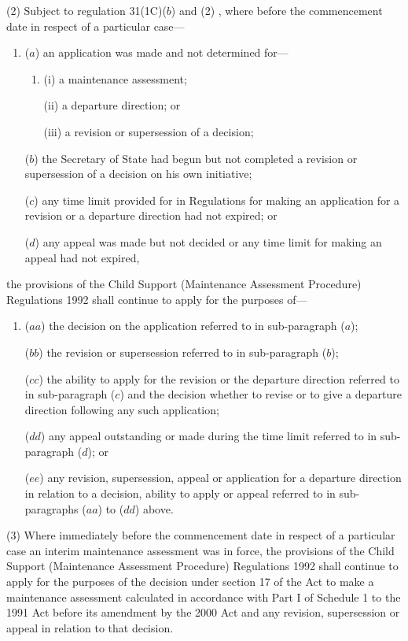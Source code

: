 \documentclass[12pt,a4paper]{article}
\begin{document}
(2) Subject to 
regulation 31(1C)($b$)  and (2)%
, where before the commencement date in respect of a particular case—
\begin{enumerate}\item[]
($a$) an application was made and not determined for—
\begin{enumerate}\item[]
(i) a maintenance assessment;

(ii) a departure direction; or

(iii) a revision or supersession of a decision;
\end{enumerate}

($b$) the Secretary of State had begun but not completed a revision or supersession of a decision on his own initiative;

($c$) any time limit provided for in Regulations for making an application for a revision or a departure direction had not expired; or

($d$) any appeal was made but not decided or any time limit for making an appeal had not expired,
\end{enumerate}
the provisions of the Child Support (Maintenance Assessment Procedure) Regulations 1992 shall continue to apply for the purposes of—
\begin{enumerate}\item[]
($aa$) the decision on the application referred to in sub-paragraph ($a$);

($bb$) the revision or supersession referred to in sub-paragraph ($b$);

($cc$) the ability to apply for the revision or the departure direction referred to in sub-paragraph ($c$)  and the decision whether to revise or to give a departure direction following any such application;

($dd$) any appeal outstanding or made during the time limit referred to in sub-paragraph ($d$); or

($ee$) any revision, supersession, appeal or application for a departure direction in relation to a decision, ability to apply or appeal referred to in sub-paragraphs ($aa$)  to ($dd$)  above.
\end{enumerate}

(3) Where immediately before the commencement date in respect of a particular case an interim maintenance assessment was in force, the provisions of the Child Support (Maintenance Assessment Procedure) Regulations 1992 shall continue to apply for the purposes of the decision under section 17 of the Act to make a maintenance assessment calculated in accordance with Part I of Schedule 1 to the 1991 Act before its amendment by the 2000 Act and any revision, supersession or appeal in relation to that decision.
\end{document}
